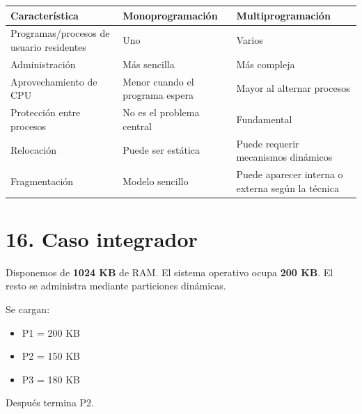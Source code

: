 \documentclass[
  spanish,
  letterpaper,
]{scrbook}
\newcounter{none} %
\providecommand{\tightlist}{%
  \setlength{\itemsep}{0pt}\setlength{\parskip}{0pt}}
\begin{document}
{\def\LTcaptype{none} %
\begin{longtable}[]{@{}
  >{\raggedright\arraybackslash}p{}
  >{\raggedright\arraybackslash}p{}
  >{\raggedright\arraybackslash}p{}@{}}
\toprule\noalign{}
\begin{minipage}[b]{\linewidth}\raggedright
Característica
\end{minipage} & \begin{minipage}[b]{\linewidth}\raggedright
Monoprogramación
\end{minipage} & \begin{minipage}[b]{\linewidth}\raggedright
Multiprogramación
\end{minipage} \\
\midrule\noalign{}
\endhead
\bottomrule\noalign{}
\endlastfoot
Programas/procesos de usuario residentes & Uno & Varios \\
Administración & Más sencilla & Más compleja \\
Aprovechamiento de CPU & Menor cuando el programa espera & Mayor al
alternar procesos \\
Protección entre procesos & No es el problema central & Fundamental \\
Relocación & Puede ser estática & Puede requerir mecanismos dinámicos \\
Fragmentación & Modelo sencillo & Puede aparecer interna o externa según
la técnica \\
\end{longtable}
}

\section{16. Caso integrador}\label{caso-integrador-3}

Disponemos de \textbf{1024 KB} de RAM. El sistema operativo ocupa
\textbf{200 KB}. El resto se administra mediante particiones dinámicas.

Se cargan:

\begin{itemize}
\tightlist
\item
  P1 = 200 KB
\item
  P2 = 150 KB
\item
  P3 = 180 KB
\end{itemize}

Después termina P2.
\end{document}
